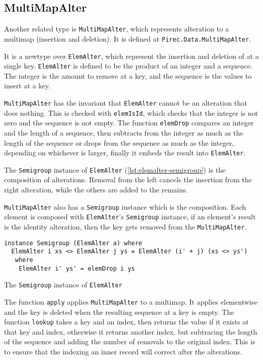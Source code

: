 \subsection{MultiMapAlter}\label{ssec:multimapalter}

Another related type is \texttt{MultiMapAlter}, which represents
alteration to a multimap (insertion and deletion). It is defined at
\texttt{Pirec.Data.MultiMapAlter}.

It is a newtype over \texttt{ElemAlter}, which represent the insertion
and deletion of at a single key. \texttt{ElemAlter} is defined to be the
product of an integer and a sequence. The integer is the amount to remove at a
key, and the sequence is the values to insert at a key.

\texttt{MultiMapAlter} has the invariant that \texttt{ElemAlter}
cannot be an alteration that does nothing. This is checked with
\texttt{elemIsId}, which checks that the integer is not zero and the
sequence is not empty. The function \texttt{elemDrop} compares an
integer and the length of a sequence, then subtracts from the integer as much as
the length of the sequence or drops from the sequence as much as the integer,
depending on whichever is larger, finally it embeds the result into
\texttt{ElemAlter}.

The \texttt{Semigroup} instance of \texttt{ElemAlter}
(\cref{lst:elemalter-semigroup}) is the composition of alterations. Removal from
the left cancels the insertion from the right alteration, while the others are
added to the remains.

\texttt{MultiMapAlter} also has a \texttt{Semigroup} instance
which is the composition. Each element is composed with
\texttt{ElemAlter}'s \texttt{Semigroup} instance, if an
element's result is the identity alteration, then the key gets removed from the
\texttt{MultiMapAlter}.

\begin{listing}
  \begin{verbatim}
instance Semigroup (ElemAlter a) where
  ElemAlter i xs <> ElemAlter j ys = ElemAlter (i' + j) (xs <> ys')
   where
    ElemAlter i' ys' = elemDrop i ys
  \end{verbatim}
  \caption{The \texttt{Semigroup} instance of \texttt{ElemAlter}
  }\label{lst:elemalter-semigroup}
\end{listing}

The function \texttt{apply} applies \texttt{MultiMapAlter} to a
multimap. It applies elementwise and the key is deleted when the resulting
sequence at a key is empty. The function \texttt{lookup} takes a key and
an index, then returns the value if it exists at that key and index, otherwise
it returns another index, but subtracing the length of the sequence and adding
the number of removals to the original index. This is to ensure that the
indexing an inner record will correct after the alterations.

